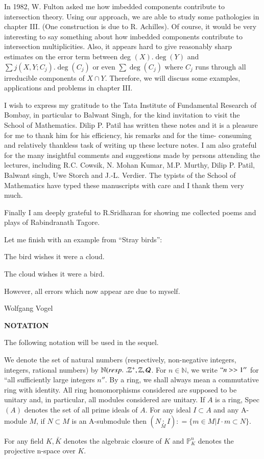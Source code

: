 In 1982, W. Fulton asked me how imbedded components contribute to
intersection theory. Using our approach, we are able to study some
pathologies in chapter III. (One construction is due to
R. Achilles). Of course, it would be very interesting to say something
about how imbedded components contribute to intersection
multiplicities. Also, it appears hard to give reasonably sharp
estimates on the error term between deg $(X). \deg (Y)$ and $\sum j
(X, Y; C_j). \deg (C_j)$ or even $\sum \deg (C_j)$ where $C_j$ runs
through all irreducible components of $X \cap Y$. Therefore, we will
discuss some examples, applications and problems in chapter III. 

I wish to express my gratitude to the Tata Institute of Fundamental
Research of Bombay, in particular to Balwant Singh, for the kind
invitation to visit the School of Mathematics. Dilip P. Patil has
written these notes and it is a pleasure for me to thank him for his
efficiency, his remarks and for the time- consuming and relatively
thankless task of writing up these lecture notes. I am also grateful
for the many insightful comments and suggestions made by persons
attending the lectures, including R.C. Cowsik, N. Mohan Kumar,
M.P. Murthy, Dilip P. Patil, Balwant singh, Uwe Storch and
J.-L. Verdier. The typists of the School of Mathematics have typed
these manuscripts with care and I thank them very much. 

Finally I am deeply grateful to R.Sridharan for showing me collected
poems and plays of Rabindranath Tagore.

Let me finish with an example from ``Stray birds'': 

The bird wishes it were a cloud.

The cloud wishes it were a bird.

However, all errors which now appear are due to myself.

\hfill {Wolfgang Vogel}

\begin{center}
\textbf{NOTATION }
\end{center}

The following notation will be used in the sequel.

We denote the set of natural numbers (respectively, non-negative
integers, integers, rational numbers) by $\mathbb{N} ({resp.}\kern.3em
. \mathbb{Z}^+, \mathbb{Z}, \mathcal{Q}$. For $n \in
\mathbb{N}$, we write $``n >> 1''$ for ``all sufficiently large
integers $n''$. By a ring, we shall always mean a commutative ring
with identity. All ring homomorphisms considered are supposed to be
unitary and, in particular, all modules considered are unitary. If $A$
is a ring, Spec $(A)$ denotes the set of all prime ideals of $A$. For
any ideal $I \subset A$ and any A-module $M$, if $N \subset M $ is an
A-submodule then $(N \underset{M}{:} I): = \{ m \in M | I\cdot m
\subset N \}$. 

For any field $K, \bar{K}$ denotes the algebraic closure of $K$ and
$\mathds{P}^n_K$ denotes the projective n-space over $K$. 
